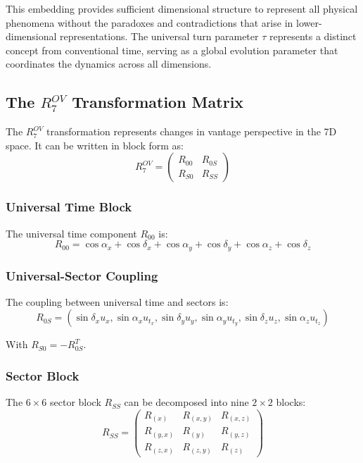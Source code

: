 \documentclass{article}
\begin{document}
This embedding provides sufficient dimensional structure to represent all physical phenomena without the paradoxes and contradictions that arise in lower-dimensional representations. The universal turn parameter $\tau$ represents a distinct concept from conventional time, serving as a global evolution parameter that coordinates the dynamics across all dimensions.

\subsection{The $R^{OV}_7$ Transformation Matrix}

The $R^{OV}_7$ transformation represents changes in vantage perspective in the 7D space. It can be written in block form as:
\begin{equation}
R^{OV}_7 = \begin{pmatrix} 
R_{00} & R_{0S} \\
R_{S0} & R_{SS}
\end{pmatrix}
\end{equation}

\subsubsection{Universal Time Block}
The universal time component $R_{00}$ is:
\begin{equation}
R_{00} = \cos\alpha_x + \cos\delta_x + \cos\alpha_y + \cos\delta_y + \cos\alpha_z + \cos\delta_z
\end{equation}

\subsubsection{Universal-Sector Coupling}
The coupling between universal time and sectors is:
\begin{equation}
R_{0S} = (\sin\delta_x u_x, \sin\alpha_x u_{t_x}, \sin\delta_y u_y, \sin\alpha_y u_{t_y}, \sin\delta_z u_z, \sin\alpha_z u_{t_z})
\end{equation}

With $R_{S0} = -R_{0S}^T$.

\subsubsection{Sector Block}
The $6 \times 6$ sector block $R_{SS}$ can be decomposed into nine $2 \times 2$ blocks:
\begin{equation}
R_{SS} = \begin{pmatrix}
R_{(x)} & R_{(x,y)} & R_{(x,z)} \\
R_{(y,x)} & R_{(y)} & R_{(y,z)} \\
R_{(z,x)} & R_{(z,y)} & R_{(z)}
\end{pmatrix}
\end{equation}
\end{document}
